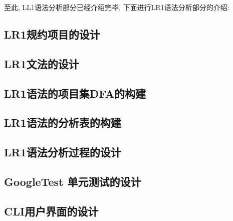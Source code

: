 至此, LL1语法分析部分已经介绍完毕, 下面进行LR1语法分析部分的介绍:

\subsection{LR1规约项目的设计}
\subsection{LR1文法的设计}
\subsection{LR1语法的项目集DFA的构建}
\subsection{LR1语法的分析表的构建}
\subsection{LR1语法分析过程的设计}

\subsection{GoogleTest 单元测试的设计}
\subsection{CLI用户界面的设计}
